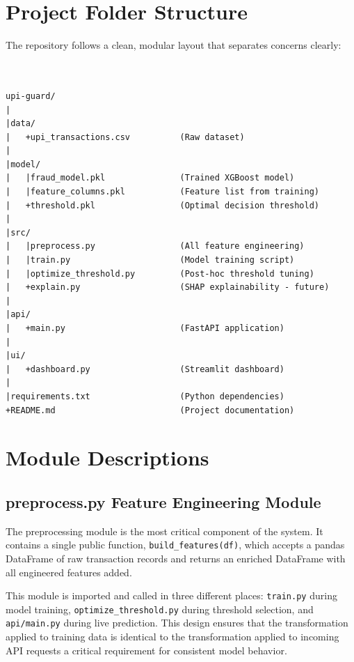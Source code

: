 \section{Project Folder Structure}

The repository follows a clean, modular layout that separates concerns clearly:

\begin{verbatim}


upi-guard/
|
|data/
|   +upi_transactions.csv          (Raw dataset)
|
|model/
|   |fraud_model.pkl               (Trained XGBoost model)
|   |feature_columns.pkl           (Feature list from training)
|   +threshold.pkl                 (Optimal decision threshold)
|
|src/
|   |preprocess.py                 (All feature engineering)
|   |train.py                      (Model training script)
|   |optimize_threshold.py         (Post-hoc threshold tuning)
|   +explain.py                    (SHAP explainability - future)
|
|api/
|   +main.py                       (FastAPI application)
|
|ui/
|   +dashboard.py                  (Streamlit dashboard)
|
|requirements.txt                  (Python dependencies)
+README.md                         (Project documentation)
\end{verbatim}

\section{Module Descriptions}

\subsection{preprocess.py Feature Engineering Module}

\label{sec:preprocess_module}

The preprocessing module is the most critical component of the system. It contains a single public function, \texttt{build\_features(df)}, which accepts a pandas DataFrame of raw transaction records and returns an enriched DataFrame with all engineered features added.

This module is imported and called in three different places: \texttt{train.py} during model training, \texttt{optimize\_threshold.py} during threshold selection, and \texttt{api/main.py} during live prediction. This design ensures that the transformation applied to training data is identical to the transformation applied to incoming API requests a critical requirement for consistent model behavior.


